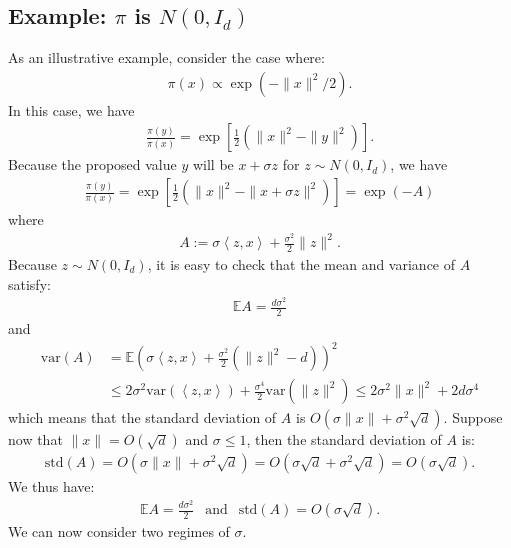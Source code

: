 \documentclass{scrartcl}
\newcommand{\E}{{\mathbb E}}
\begin{document}
\subsection{Example: $\pi$ is $N(0, I_d)$}
As an illustrative example, consider the case where:
\begin{align*}
  \pi(x) \propto \exp(-\|x\|^2/2). 
\end{align*}
In this case, we have
\begin{align*}
  \frac{\pi(y)}{\pi(x)} = \exp \left[\frac{1}{2} \left(\|x\|^2 -
  \|y\|^2 \right) \right]. 
\end{align*}
Because the proposed value $y$ will be $x + \sigma z$ for $z \sim N(0,
I_d)$, we have
\begin{align*}
  \frac{\pi(y)}{\pi(x)} = \exp \left[\frac{1}{2} \left(\|x\|^2 - \|x +
  \sigma z\|^2\right) \right] = \exp(-A)
\end{align*}
where
\begin{align*}
  A := \sigma  \left<z, x \right> + \frac{\sigma^2}{2} \|z\|^2. 
\end{align*}
Because $z \sim N(0, I_d)$, it is easy to check that the mean and
variance of $A$ satisfy:
\begin{align*}
  \E A = \frac{d \sigma^2}{2}
\end{align*}
and
\begin{align*}
  \text{var}(A) &= \E \left( \sigma  \left<z, x \right> +
  \frac{\sigma^2}{2} (\|z\|^2 - d)  \right)^2 \\ &\leq 2 \sigma^2
  \text{var}(\left<z, x \right>) + \frac{\sigma^4}{2}
  \text{var}(\|z\|^2) \leq 2 \sigma^2\|x\|^2 + 2 d \sigma^4
\end{align*}
which means that the standard deviation of $A$ is $O(\sigma \|x\| +
\sigma^2 \sqrt{d})$. Suppose now that $\|x\| = O(\sqrt{d})$ and
$\sigma \leq 1$, then the standard deviation of $A$ is:
\begin{align*}
  \text{std}(A) = O \left(\sigma \|x\| + \sigma^2 \sqrt{d} \right) = O
  \left(\sigma \sqrt{d} + \sigma^2 \sqrt{d} \right) = O(\sigma
  \sqrt{d}). 
\end{align*}
We thus have:
\begin{align*}
  \E A = \frac{d\sigma^2}{2} ~~ \text{ and } ~~ \text{std}(A) =
  O(\sigma \sqrt{d}). 
\end{align*}
We can now consider two regimes of $\sigma$.
\end{document}
